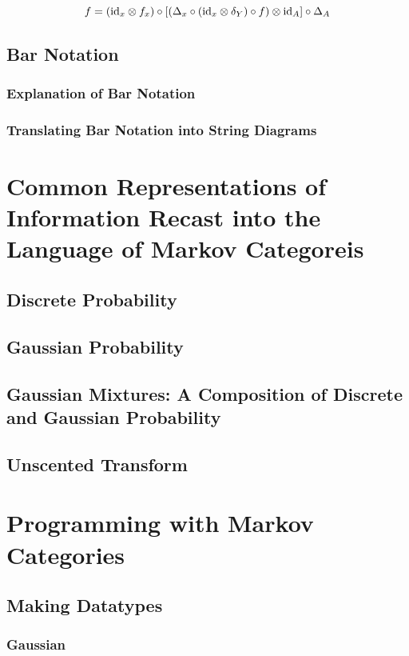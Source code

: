 \begin{equation}
\label{eq:conditional-parallel-compositions}
f = (\mathrm{id}_x \otimes f_x) \circ \left[\left(\Delta_x \circ (\mathrm{id}_x\otimes \delta_Y) \circ f\right) \otimes \mathrm{id}_A\right] \circ \Delta_A
\end{equation}

\section{Bar Notation}
\subsection{Explanation of Bar Notation}
\subsection{Translating Bar Notation into String Diagrams}

\chapter{Common Representations of Information Recast into the Language of Markov Categoreis}
\section{Discrete Probability}
\section{Gaussian Probability}
\section{Gaussian Mixtures: A Composition of Discrete and Gaussian Probability}
\section{Unscented Transform}

\chapter{Programming with Markov Categories}
\section{Making Datatypes}
\subsection{Gaussian}
